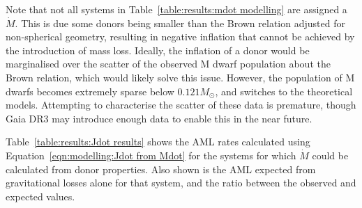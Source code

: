 
Note that not all systems in Table~\ref{table:results:mdot modelling} are assigned a $\dot M$.
This is due some donors being smaller than the Brown relation adjusted for non-spherical geometry, resulting in negative inflation that cannot be achieved by the introduction of mass loss.
Ideally, the inflation of a donor would be marginalised over the scatter of the observed M dwarf population about the Brown relation, which would likely solve this issue.
However, the population of M dwarfs becomes extremely sparse below $0.121 M_\odot$, and switches to the \citet{baraffe2015} theoretical models.
Attempting to characterise the scatter of these data is premature, though Gaia DR3 may introduce enough data to enable this in the near future.

Table~\ref{table:results:Jdot results} shows the AML rates calculated using Equation~\ref{eqn:modelling:Jdot from Mdot} for the systems for which $\dot M$ could be calculated from donor properties. Also shown is the AML expected from gravitational losses alone for that system, and the ratio between the observed and expected values.

